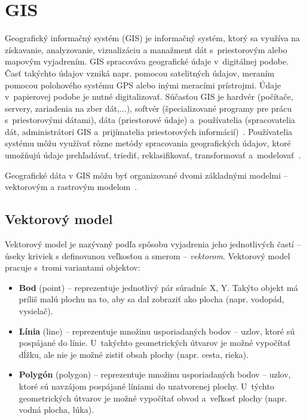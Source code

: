 
\section{GIS}
Geografický informačný systém (GIS) je informačný systém, ktorý sa využíva na získavanie, analyzovanie, vizualizáciu a manažment dát s~priestorovým alebo mapovým vyjadrením. GIS spracováva geografické údaje v~digitálnej podobe. Časť takýchto údajov vzniká napr. pomocou satelitných údajov, meraním pomocou polohového systému GPS alebo inými meracími prístrojmi. Údaje v~papierovej podobe je nutné digitalizovať. Súčasťou GIS je hardvér (počítače, servery, zariadenia na zber dát,...), softvér (špecializované programy pre prácu s~priestorovými dátami), dáta (priestorové údaje) a~používatelia (spracovatelia dát, administrátori GIS a~prijímatelia priestorových informácií)~\cite{introductiontogis}. Používatelia systému môžu využívať rôzne metódy spracovania geografických údajov, ktoré umožňujú údaje prehľadávať, triediť, reklasifikovať, transformovať a~modelovať~\cite{hofierka2003gis}.

Geografické dáta v GIS môžu byť organizované dvomi základnými modelmi \--- vektorovým a rastrovým modelom~\cite{holman2014priestorovedata}.

\subsection{Vektorový model}
Vektorový model je nazývaný podľa spôsobu vyjadrenia jeho jednotlivých častí \--- úseky kriviek s definovanou veľkosťou a smerom \--- \emph{vektorom}. Vektorový model pracuje s~tromi variantami objektov:
\begin{itemize}
    \item \textbf{Bod} (point) \--- reprezentuje jednotlivý pár súradníc X, Y. Takýto objekt má príliš malú plochu na to, aby sa dal zobraziť ako plocha (napr. vodopád, vysielač).
    \item \textbf{Línia} (line) \--- reprezentuje množinu usporiadaných bodov \--- uzlov, ktoré sú pospájané do línie. U~takýchto geometrických útvarov je možné vypočítať dĺžku, ale nie je možné zistiť obsah plochy (napr. cesta, rieka).
    \item \textbf{Polygón} (polygon) \--- reprezentuje množinu usporiadaných bodov \--- uzlov, ktoré sú navzájom pospájané líniami do uzatvorenej plochy. U~týchto geometrických útvarov je možné vypočítať obvod a~veľkosť plochy (napr. vodná plocha, lúka).
\end{itemize}

